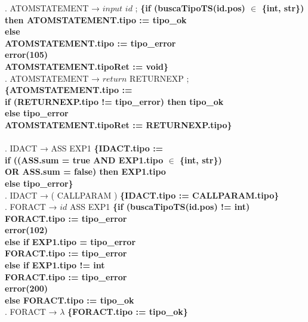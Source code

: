 \begin{tabbing}
    . ATOMSTATEMENT → $input$ $id$ ; \textbf{\{if (buscaTipoTS(id.pos) $\in$ \{int, str\})}\\
    \>                    \> \>\textbf{then ATOMSTATEMENT.tipo := tipo\_ok}\\
    \>                    \> \textbf{else} \\
    \> \> \> \textbf{ATOMSTATEMENT.tipo := tipo\_error}\\
    \> \> \> \textbf{error(105)}\\
    \>                    \> \textbf{ATOMSTATEMENT.tipoRet := void\}}\\
    . ATOMSTATEMENT → $return$ RETURNEXP ; \textbf{\{ATOMSTATEMENT.tipo :=}\\
    \>                    \> \textbf{if (RETURNEXP.tipo != tipo\_error) then tipo\_ok}\\
    \>                    \> \textbf{else tipo\_error}\\
    \>                    \> \textbf{ATOMSTATEMENT.tipoRet := RETURNEXP.tipo\}}\\
    \\
    . IDACT → ASS EXP1 \textbf{\{IDACT.tipo :=}\\
    \>                    \> \textbf{if ((ASS.sum = true AND EXP1.tipo $\in$ \{int, str\})}\\
    \>                    \> \>\textbf{OR ASS.sum = false) then EXP1.tipo}\\
    \>                    \> \textbf{else tipo\_error\}}\\
    . IDACT → ( CALLPARAM ) \textbf{\{IDACT.tipo := CALLPARAM.tipo\}}\\
    . FORACT → $id$ ASS EXP1 \textbf{\{if (buscaTipoTS(id.pos) != int)}\\
    \> \> \> \textbf{FORACT.tipo := tipo\_error}\\
    \> \> \> \textbf{error(102)}\\
    \> \> \textbf{else if EXP1.tipo = tipo\_error}\\
    \> \> \> \textbf{FORACT.tipo := tipo\_error}\\
    \> \> \textbf{else if EXP1.tipo != int} \\
        \> \> \> \textbf{FORACT.tipo := tipo\_error}\\
    \> \> \> \textbf{error(200)}\\
    \> \> \textbf{else FORACT.tipo := tipo\_ok}\\
    . FORACT → $\lambda$ \textbf{\{FORACT.tipo := tipo\_ok\}}\\

\end{tabbing}

